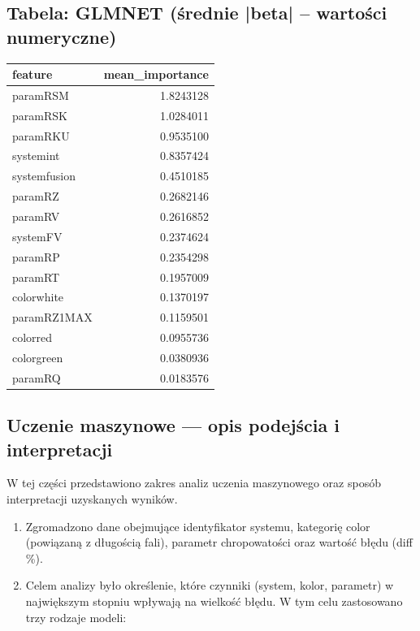 \documentclass[
  10pt,
]{article}
\providecommand{\tightlist}{%
  \setlength{\itemsep}{0pt}\setlength{\parskip}{0pt}}
\begin{document}
\subsection{Tabela: GLMNET (średnie |beta| – wartości numeryczne)}

\begin{tabular}{l|r}
\hline
feature & mean\_importance\\
\hline
paramRSM & 1.8243128\\
\hline
paramRSK & 1.0284011\\
\hline
paramRKU & 0.9535100\\
\hline
systemint & 0.8357424\\
\hline
systemfusion & 0.4510185\\
\hline
paramRZ & 0.2682146\\
\hline
paramRV & 0.2616852\\
\hline
systemFV & 0.2374624\\
\hline
paramRP & 0.2354298\\
\hline
paramRT & 0.1957009\\
\hline
colorwhite & 0.1370197\\
\hline
paramRZ1MAX & 0.1159501\\
\hline
colorred & 0.0955736\\
\hline
colorgreen & 0.0380936\\
\hline
paramRQ & 0.0183576\\
\hline
\end{tabular}

\subsection{Uczenie maszynowe --- opis podejścia i
interpretacji}\label{uczenie-maszynowe-opis-podejux15bcia-i-interpretacji}

W tej części przedstawiono zakres analiz uczenia maszynowego oraz
sposób interpretacji uzyskanych wyników.

\begin{enumerate}
\def\labelenumi{\arabic{enumi}.}
\tightlist
\item
  Zgromadzono dane obejmujące identyfikator systemu, kategorię color
  (powiązaną z długością fali), parametr chropowatości oraz wartość
  błędu (\textbar diff\textbar{} \%).
\item
  Celem analizy było określenie, które czynniki (system, kolor,
  parametr) w największym stopniu wpływają na wielkość błędu. W tym
  celu zastosowano trzy rodzaje modeli:
\end{enumerate}
\end{document}
